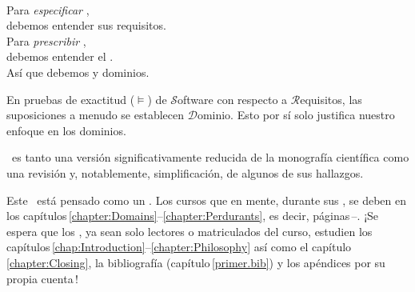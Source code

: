 \label{chap:Introduction}\label{chap:Introduction.1}
\minitoc

\begin{flushright}\label{intro:The Triptych Dogma}
\\[4mm]
\sf Para \textsl{especificar} ,\\
\sf debemos entender sus requisitos.\\[1mm]
\sf Para \textsl{prescribir} ,\\
\sf debemos entender el .\\[1mm]
\sf Así que debemos  y  dominios.\\
\end{flushright}\rm%
\mnewfoil

\noindent
\begynd
\pind En pruebas de exactitud ($\models$)
\begynd
\pind de $\mathcal{S}$oftware
\pind con respecto a $\mathcal{R}$equisitos,
\pind las suposiciones a menudo se establecen  $\mathcal{D}$ominio.
\afslut
\pind Esto por sí solo justifica nuestro enfoque en los dominios.
\afslut
\endboiteepaisseavecuntitre

\mnewfoil

\noindent
\begynd
\pind {} \primer\ es
\begynd
\pind tanto una versión significativamente reducida \nyl de la monografía científica \cite{BjornerMonograph2020} 
\pind como una revisión y, notablemente, simplificación, de algunos de sus hallazgos.
\afslut
\afslut

\label{sec:Why This Primer}

\begynd
\pind Este \primer\ está pensado como un .
\pind Los cursos que  en mente, durante sus , se deben  en los
      capítulos\,\ref{chapter:Domains}--\ref{chapter:Perdurants},
      es decir, páginas\,\pageref{chapter:Domains}--\pageref{chapter:Perdurants.n}.
\pind ¡Se espera que los , ya sean solo lectores o matriculados del curso, estudien
      los capítulos\,\ref{chap:Introduction}--\ref{chapter:Philosophy} así
      como el capítulo\,\ref{chapter:Closing}, la bibliografía
      (capítulo\,\ref{primer.bib}) y los apéndices por su propia cuenta\,!
\afslut

